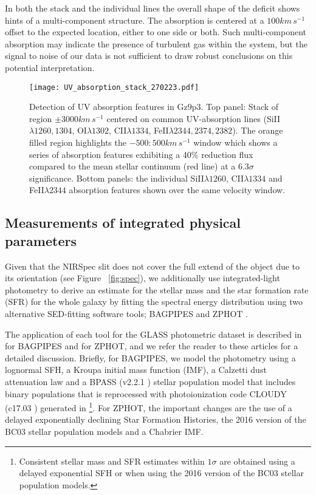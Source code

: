 \documentclass[sn-mathphys]{sn-jnl}%
\theoremstyle{thmstyleone}%
\theoremstyle{thmstyletwo}%
\theoremstyle{thmstylethree}%
\begin{document}
In both the stack and the individual lines the overall shape of the deficit shows hints of a multi-component structure. The absorption is centered at a $100km\, s^{-1}$ offset to the expected location, either to one side or both. Such multi-component absorption may indicate the presence of turbulent gas within the system, but the signal to noise of our data is not sufficient to draw robust conclusions on this potential interpretation. 


\begin{figure*}
    \centering
    \texttt{[image: UV\_absorption\_stack\_270223.pdf]}
    \caption{Detection of UV absorption features in Gz9p3. Top panel: Stack of region $\pm3000km\,s^{-1}$ centered on common UV-absorption lines (SiII$\lambda1260,1304$, OI$\lambda1302$, CII$\lambda1334$, FeII$\lambda2344,2374,2382$). The orange filled region highlights the $-500:500km\,s^{-1}$ window which shows a series of absorption features exhibiting a 40$\%$ reduction flux compared to the mean stellar continuum (red line) at a $6.3\sigma$ significance. Bottom panels: the individual SiII$\lambda1260$, CII$\lambda1334$ and FeII$\lambda2344$ absorption features shown over the same velocity window. }
    \label{fig:uv_absorption}
\end{figure*}

\subsection{Measurements of integrated physical parameters} \label{sec:SED}
Given that the NIRSpec slit does not cover the full extend of the object due to its orientation (see Figure ~\ref{fig:spec}), we additionally use integrated-light photometry to derive an estimate for the stellar mass and the star formation rate (SFR) for the whole galaxy by fitting the spectral energy distribution using two alternative SED-fitting software tools; BAGPIPES \citep{Carnall18} and ZPHOT \citep{Fontana00}.

The application of each tool for the GLASS photometric dataset is described in \cite{Leethochawalit23} for BAGPIPES and \cite{Santini2022} for ZPHOT, and we refer the reader to these articles for a detailed discussion.  Briefly, for BAGPIPES, we model the photometry using a lognormal SFH, a Kroupa \cite{Kroupa02} initial mass function (IMF), a Calzetti \cite{Calzetti00} dust attenuation law and a BPASS (v2.2.1 \cite{EldridgeStanway2009}) stellar population model that includes binary populations that is reprocessed with photoionization code CLOUDY (c17.03 \cite{Ferland2017}) generated in \cite[][private communication with Adam Carnal]{Hsiao2022}\footnote{Consistent stellar mass and SFR estimates within $1\sigma$ are obtained using a delayed exponential SFH or when using the 2016 version of the BC03 \cite{Bruzual03} stellar population models.}.
For ZPHOT, the important changes are the use of a delayed exponentially declining Star Formation Histories, the 2016 version of the BC03 \cite{Bruzual03} stellar population models and a Chabrier \cite{Chabrier_03} IMF. 
\end{document}
